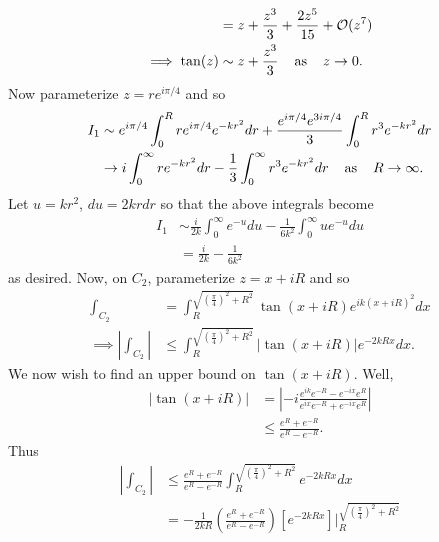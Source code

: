 \documentclass{article}
\begin{document}
\begin{itemize}
\begin{itemize}
\begin{align*}
            &= z + \frac{z^3}{3} + \frac{2z^5}{15} + \mathcal{O}(z^7)\\
            \implies \tan(z) &\sim z + \frac{z^3}{3} \hspace{0.4cm} \text{as} \hspace{0.4cm} z \to 0.
        \end{align*}
        Now parameterize $z = re^{i\pi/4}$ and so
        \begin{align*}
            I_1 &\sim e^{i\pi/4}\int_0^{R}re^{i\pi/4}e^{-kr^2}dr + \frac{e^{i\pi/4}e^{3i\pi/4}}{3}\int_0^{R}r^3e^{-kr^2}dr\\
            &\to i\int_0^{\infty}re^{-kr^2}dr - \frac{1}{3}\int_0^{\infty}r^3e^{-kr^2}dr \hspace{0.4cm} \text{as} \hspace{0.4cm} R \to \infty.
        \end{align*}
        Let $u = kr^2$, $du = 2krdr$ so that the above integrals become
        \begin{align*}
            I_1 &\sim \frac{i}{2k}\int_0^{\infty}e^{-u}du - \frac{1}{6k^2}\int_0^{\infty}ue^{-u}du\\
            &= \frac{i}{2k} - \frac{1}{6k^2}
        \end{align*}
        as desired. Now, on $C_2$, parameterize $z = x + iR$ and so
        \begin{align*}
            \int_{C_2} &= \int_R^{\sqrt{\left(\frac{\pi}{4}\right)^2 + R^2}}\tan(x + iR)e^{ik(x + iR)^2}dx\\
            \implies \left|\int_{C_2}\right| &\leq \int_R^{\sqrt{\left(\frac{\pi}{4}\right)^2 + R^2}}|\tan(x + iR)|e^{-2kRx}dx.
        \end{align*}
        We now wish to find an upper bound on $\tan(x + iR)$. Well,
        \begin{align*}
            |\tan(x + iR)| &= \left|-i\frac{e^{ik}e^{-R} - e^{-ix}e^{R}}{e^{ix}e^{-R} + e^{-ix}e^{R}}\right|\\
            &\leq \frac{e^R + e^{-R}}{e^R - e^{-R}}.
        \end{align*}
        Thus
        \begin{align*}
            \left|\int_{C_2}\right| &\leq \frac{e^R + e^{-R}}{e^R - e^{-R}}\int_R^{\sqrt{\left(\frac{\pi}{4}\right)^2 + R^2}} e^{-2kRx}dx\\
            &= -\frac{1}{2kR}\left(\frac{e^R + e^{-R}}{e^R - e^{-R}}\right)\left[e^{-2kRx}\right]\bigg|_R^{\sqrt{\left(\frac{\pi}{4}\right)^2 + R^2}}\\

\end{align*}
\end{itemize}
\end{itemize}
\end{document}
